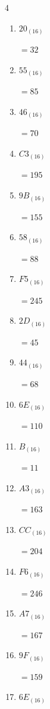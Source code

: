 \begin{multicols}{4}
\begin{enumerate}
  \item $20_{(16)}$

        $=32$

  \item $55_{(16)}$

        $=85$

  \item $46_{(16)}$

        $=70$

  \item $C3_{(16)}$

        $=195$

  \item $9B_{(16)}$

        $=155$

  \item $58_{(16)}$

        $=88$

\columnbreak %

  \item $F5_{(16)}$

        $=245$

  \item $2D_{(16)}$

        $=45$

  \item $44_{(16)}$

        $=68$

  \item $6E_{(16)}$

        $=110$

  \item $B_{(16)}$

        $=11$

  \item $A3_{(16)}$

        $=163$

  \item $CC_{(16)}$

        $=204$

  \item $F6_{(16)}$

        $=246$

  \item $A7_{(16)}$

        $=167$

  \item $9F_{(16)}$

        $=159$

  \item $6E_{(16)}$


\end{enumerate}
\end{multicols}
